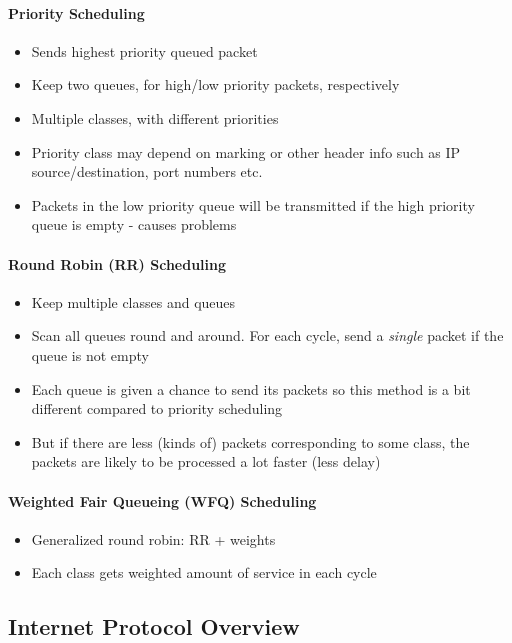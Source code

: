 \paragraph{Priority Scheduling}
\begin{itemize}
	\item Sends highest priority queued packet
	\item Keep two queues, for high/low priority packets, respectively
	\item Multiple classes, with different priorities
	\item Priority class may depend on marking or other header info such as IP source/destination, port numbers etc.
	\item Packets in the low priority queue will be transmitted if the high priority queue is empty - causes problems
\end{itemize}

\paragraph{Round Robin (RR) Scheduling}
\begin{itemize}
	\item Keep multiple classes and queues
	\item Scan all queues round and around. For each cycle, send a \textit{single} packet if the queue is not empty
	\item Each queue is given a chance to send its packets so this method is a bit different compared to priority scheduling
	\item But if there are less (kinds of) packets corresponding to some class, the packets are likely to be processed a lot faster (less delay)
\end{itemize}

\paragraph{Weighted Fair Queueing (WFQ) Scheduling}
\begin{itemize}
	\item Generalized round robin: RR + weights
	\item Each class gets weighted amount of service in each cycle
\end{itemize}

\subsection{Internet Protocol Overview}
\newpage

